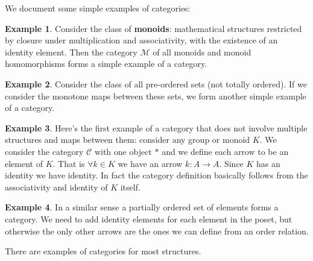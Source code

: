 \documentclass[12pt]{article}
\theoremstyle{plain}
\theoremstyle{definition}
\newtheorem{example}{Example}
\newcommand{\Cc}{\mathcal{C}}
\begin{document}
We document some simple examples of categories:

\begin{example}
Consider the class of \textbf{monoids}: mathematical structures restricted by closure under multiplication and associativity, with the existence of an identity element. Then the category $\mathcal{M}$ of all monoids and monoid homomorphisms forms a simple example of a category.
\end{example}

\begin{example}
Consider the class of all pre-ordered sets (not totally ordered). If we consider the monotone maps between these sets, we form another simple example of a category.
\end{example}

\begin{example}
Here's the first example of a category that does not involve multiple structures and maps between them: consider any group or monoid $K$. We consider the category $\Cc$ with one object $\ast$ and we define each arrow to be an element of $K$. That is $\forall k \in K$ we have an arrow $k: A \to A$. Since $K$ has an identity we have identity. In fact the category definition basically follows from the associativity and identity of $K$ itself.
\end{example}

\begin{example}
In a similar sense a partially ordered set of elements forms a category. We need to add identity elements for each element in the poset, but otherwise the only other arrows are the ones we can define from an order relation.
\end{example}

There are examples of categories for most structures.
\end{document}
